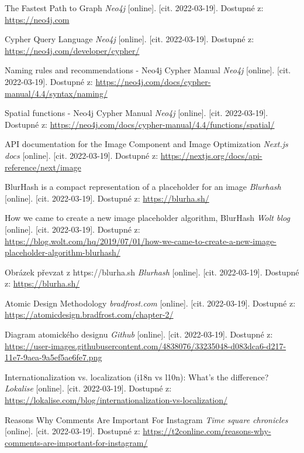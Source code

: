 \begin{thebibliography}{100}
     The Fastest Path to Graph \textit{Neo4j} [online]. [cit. 2022-03-19]. Dostupné z: \url{https://neo4j.com}
    
     Cypher Query Language \textit{Neo4j} [online]. [cit. 2022-03-19]. Dostupné z: \url{https://neo4j.com/developer/cypher/}
    
     Naming rules and recommendations - Neo4j Cypher Manual \textit{Neo4j} [online]. [cit. 2022-03-19]. Dostupné z: \url{https://neo4j.com/docs/cypher-manual/4.4/syntax/naming/}
    
     Spatial functions - Neo4j Cypher Manual \textit{Neo4j} [online]. [cit. 2022-03-19]. Dostupné z: \url{https://neo4j.com/docs/cypher-manual/4.4/functions/spatial/}
    
     API documentation for the Image Component and Image Optimization \textit{Next.js docs} [online]. [cit. 2022-03-19]. Dostupné z: \url{https://nextjs.org/docs/api-reference/next/image}
    
     BlurHash is a compact representation of a placeholder for an image \textit{Blurhash} [online]. [cit. 2022-03-19]. Dostupné z: \url{https://blurha.sh/}
    
     How we came to create a new image placeholder algorithm, BlurHash \textit{Wolt blog} [online]. [cit. 2022-03-19]. Dostupné z: \url{https://blog.wolt.com/hq/2019/07/01/how-we-came-to-create-a-new-image-placeholder-algorithm-blurhash/}
    
     Obrázek převzat z https://blurha.sh \textit{Blurhash} [online]. [cit. 2022-03-19]. Dostupné z: \url{https://blurha.sh/}
    
     Atomic Design Methodology \textit{bradfrost.com} [online]. [cit. 2022-03-19]. Dostupné z: \url{https://atomicdesign.bradfrost.com/chapter-2/}
    
     Diagram atomického designu \textit{Github} [online]. [cit. 2022-03-19]. Dostupné z: \url{https://user-images.githubusercontent.com/4838076/33235048-d083dca6-d217-11e7-9aea-9a5ef5ae6fe7.png}
    
     Internationalization vs. localization (i18n vs l10n): What’s the difference? \textit{Lokalise} [online]. [cit. 2022-03-19]. Dostupné z: \url{https://lokalise.com/blog/internationalization-vs-localization/}
    
     Reasons Why Comments Are Important For Instagram \textit{Time square chronicles} [online]. [cit. 2022-03-19]. Dostupné z: \url{https://t2conline.com/reasons-why-comments-are-important-for-instagram/}
    
    
    \end{thebibliography}
    
    \newpage{\pagestyle{empty}\cleardoublepage}